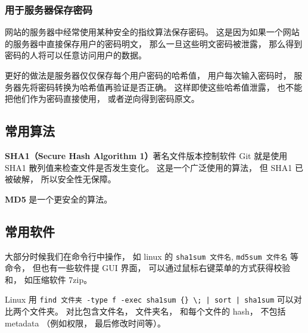 \subsubsection{用于服务器保存密码}
网站的服务器中经常使用某种安全的指纹算法保存密码。 这是因为如果一个网站的服务器中直接保存用户的密码明文， 那么一旦这些明文密码被泄露， 那么得到密码的人将可以任意访问用户的数据。

更好的做法是服务器仅仅保存每个用户密码的哈希值， 用户每次输入密码时， 服务器先将密码转换为哈希值再验证是否正确。 这样即使这些哈希值泄露， 也不能把他们作为密码直接使用， 或者逆向得到密码原文。

\subsection{常用算法}
\textbf{SHA1（Secure Hash Algorithm 1）}著名文件版本控制软件 Git %
就是使用 SHA1 散列值来检查文件是否发生变化。 这是一个广泛使用的算法， 但 SHA1 已被破解， 所以安全性无保障。

\textbf{MD5} 是一个更安全的算法。

\subsection{常用软件}
大部分时候我们在命令行中操作， 如 linux 的 \verb|sha1sum 文件名|, \verb|md5sum 文件名| 等命令， 但也有一些软件提 GUI 界面， 可以通过鼠标右键菜单的方式获得校验和， 如压缩软件 7zip。

Linux 用 \verb`find 文件夹 -type f -exec sha1sum {} \; | sort | sha1sum` 可以对比两个文件夹。 对比包含文件名， 文件夹名， 和每个文件的 hash， 不包括 metadata （例如权限， 最后修改时间等）。
